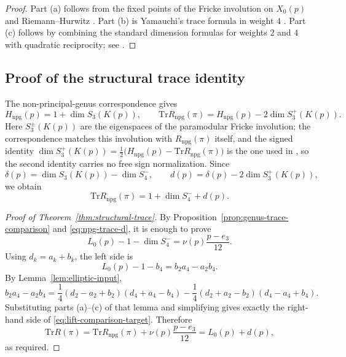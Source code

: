 \documentclass[11pt]{amsart}
\theoremstyle{plain}
\theoremstyle{definition}
\newcommand{\Tr}{\mathrm{Tr}}
\begin{document}
	\begin{proof}
		Part \textup{(a)} follows from the fixed points of the Fricke involution
		on $X_0(p)$ and Riemann--Hurwitz \cite[\S2]{Ogg1974}. Part \textup{(b)} is Yamauchi's trace
		formula in weight $4$ \cite{Yamauchi1973}. Part \textup{(c)} follows by combining the standard
		dimension formulas for weights $2$ and $4$ with quadratic reciprocity; see
		\cite{AtkinLehner,Ibukiyama-dim}.
	\end{proof}
	
	\subsection{Proof of the structural trace identity}
	\label{ss:proof-structural-trace}
	
	The non-principal-genus correspondence \cite{DPRT,Ibukiyama-dim} gives
	\begin{equation}\label{eq:npg-dimension-trace}
		H_{\mathrm{npg}}(p)=1+\dim S_3(K(p)),
		\qquad
		\Tr R_{\mathrm{npg}}(\pi)
		=H_{\mathrm{npg}}(p)-2\dim S_3^+(K(p)).
	\end{equation}
	Here $S_3^\pm(K(p))$ are the eigenspaces of the paramodular Fricke
	involution; the correspondence matches this involution with
	$R_{\mathrm{npg}}(\pi)$ itself, and the signed identity
	$\dim S_3^{+}(K(p))=\tfrac12\bigl(H_{\mathrm{npg}}(p)-\Tr R_{\mathrm{npg}}(\pi)\bigr)$
	is the one used in \cite[proof of Prop.~8.2]{Ibukiyama-dim}, so the
	second identity carries no free sign normalization.
	Since
	\[
	\delta(p)=\dim S_3(K(p))-\dim S_4^-,
	\qquad
	d(p)=\delta(p)-2\dim S_3^+(K(p)),
	\]
	we obtain
	\begin{equation}\label{eq:npg-trace-d}
		\Tr R_{\mathrm{npg}}(\pi)=1+\dim S_4^-+d(p).
	\end{equation}
	
	\begin{proof}[Proof of Theorem~\ref{thm:structural-trace}]
		By Proposition~\ref{prop:genus-trace-comparison} and
		\eqref{eq:npg-trace-d}, it is enough to prove
		\begin{equation}\label{eq:lift-comparison-target}
			L_0(p)-1-\dim S_4^-=
			\nu(p)\frac{p-e_3}{12}.
		\end{equation}
		Using $d_k=a_k+b_k$, the left side is
		\[
		L_0(p)-1-b_4=b_2a_4-a_2b_4.
		\]
		By Lemma~\ref{lem:elliptic-input},
		\[
		b_2a_4-a_2b_4
		=\frac14(d_2-a_2+b_2)(d_4+a_4-b_4)
		-\frac14(d_2+a_2-b_2)(d_4-a_4+b_4).
		\]
		Substituting parts \textup{(a)}--\textup{(c)} of that lemma and simplifying
		gives exactly the right-hand side of \eqref{eq:lift-comparison-target}.
		Therefore
		\[
		\Tr R(\pi)
		=\Tr R_{\mathrm{npg}}(\pi)+\nu(p)\frac{p-e_3}{12}
		=L_0(p)+d(p),
		\]
		as required.
	\end{proof}
	
\end{document}
